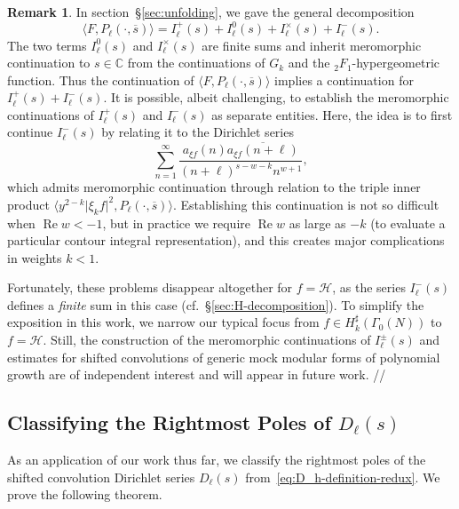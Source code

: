 \documentclass[11pt,reqno]{amsart}
\theoremstyle{plain}
\theoremstyle{definition}
\newtheorem{remark}[theorem]{Remark}
\numberwithin{equation}{section}
\renewcommand{\Re}{\operatorname{Re}}
\begin{document}
\begin{remark} \label{rem:H-specialization}
In section~\S{\ref{sec:unfolding}}, we gave the general decomposition
\[
	\langle F, P_\ell(\cdot, \overline{s}) \rangle 
	= I_\ell^+(s) + I_\ell^0(s) + I_\ell^\times(s) + I_\ell^-(s).
\]
The two terms $I_\ell^0(s)$ and $I_\ell^\times(s)$ are finite sums and inherit meromorphic continuation to $s \in \mathbb{C}$ from the continuations of $G_k$ and the ${}_2F_1$-hypergeometric function. Thus the continuation of $\langle F, P_\ell(\cdot, \overline{s}) \rangle$ implies a continuation for $I_\ell^+(s) + I_\ell^-(s)$. It is possible, albeit challenging, to establish the meromorphic continuations of $I_\ell^+(s)$ and $I_\ell^-(s)$ as separate entities. Here, the idea is to first continue $I_\ell^-(s)$ by relating it to the Dirichlet series
\[
	\sum_{n =1}^\infty \frac{a_{\xi f}(n) \overline{a_{\xi f}(n+\ell)}}{(n+\ell)^{s-w-k} n^{w+1}},
\]
which admits meromorphic continuation through relation to the triple inner product $\langle y^{2-k} \vert \xi_k f \vert^2, P_\ell(\cdot ,\overline{s}) \rangle$. Establishing this continuation is not so difficult when $\Re w < -1$, but in practice we require $\Re w$ as large as $-k$ (to evaluate a particular contour integral representation), and this creates major complications in weights $k<1$.

Fortunately, these problems disappear altogether for $f= \mathcal{H}$, as the series $I_\ell^-(s)$ defines a \emph{finite} sum in this case (cf.~\S{\ref{sec:H-decomposition}}). To simplify the exposition in this work, we narrow our typical focus from $f \in H_k^\sharp(\Gamma_0(N))$ to $f = \mathcal{H}$. Still, the construction of the meromorphic continuations of $I_\ell^\pm(s)$ and estimates for shifted convolutions of generic mock modular forms of polynomial growth are of independent interest and will appear in future work. \hfill //
\end{remark}

\subsection{Classifying the Rightmost Poles of \texorpdfstring{$D_\ell(s)$}{Dh(s)}} \label{ssec:D_h-poles}

As an application of our work thus far, we classify the rightmost poles of the shifted convolution Dirichlet series $D_\ell(s)$ from~\eqref{eq:D_h-definition-redux}. We prove the following theorem.
\end{document}

